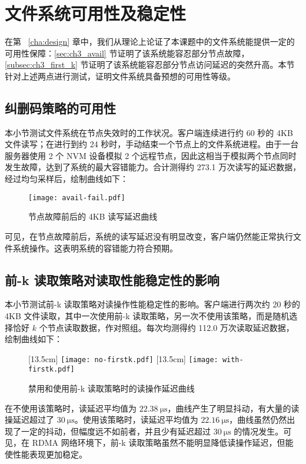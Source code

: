 \section{文件系统可用性及稳定性}
\label{sec:ch4_avail_test}

在第 ~\ref{cha:design} 章中，我们从理论上论证了本课题中的文件系统能提供一定的可用性保障：\ref{sec:ch3_avail} 节证明了该系统能容忍部分节点故障，\ref{subsec:ch3_first_k} 节证明了该系统能容忍部分节点访问延迟的突然升高。本节针对上述两点进行测试，证明文件系统具备预想的可用性等级。

\subsection{纠删码策略的可用性}
\label{subsec:ch4_fail_test}

本小节测试文件系统在节点失效时的工作状况。客户端连续进行约 60 秒的 4KB 文件读写；在进行到约 24 秒时，手动结束一个节点上的文件系统进程。由于一台服务器使用 2 个 NVM 设备模拟 2 个远程节点，因此这相当于模拟两个节点同时发生故障，达到了系统的最大容错能力。合计测得约 273.1 万次读写的延迟数据，经过均匀采样后，绘制曲线如下：

\begin{figure}[H]
    \centering
    \texttt{[image: avail-fail.pdf]}
    \caption{节点故障前后的 4KB 读写延迟曲线}
    \label{fig:avail_fail}
\end{figure}

可见，在节点故障前后，系统的读写延迟没有明显改变，客户端仍然能正常执行文件系统操作。这表明系统的容错能力符合预期。

\subsection{前-k 读取策略对读取性能稳定性的影响}
\label{subsec:ch4_first_k_test}

本小节测试前-k 读取策略对读操作性能稳定性的影响。客户端进行两次约 20 秒的 4KB 文件读取，其中一次使用前-k 读取策略，另一次不使用该策略，而是随机选择恰好 $k$ 个节点读取数据，作对照组。每次均测得约 112.0 万次读取延迟数据，绘制曲线如下：

\begin{figure}[H]
    \centering
    [13.5cm] 
        {\texttt{[image: no-firstk.pdf]}}
    [13.5cm] 
        {\texttt{[image: with-firstk.pdf]}}   
    \caption{禁用和使用前-k 读取策略时的读操作延迟曲线}
    \label{fig:first_k}
\end{figure}

在不使用该策略时，读延迟平均值为 $\SI{22.38}{\us}$，曲线产生了明显抖动，有大量的读操延迟超过了 $\SI{30}{\us}$。使用该策略时，读延迟平均值为 $\SI{22.16}{\us}$，曲线虽然仍然出现了一定的抖动，但幅度远不如前者，并且少有延迟超过 $\SI{30}{\us}$ 的情况发生。可见，在 RDMA 网络环境下，前-k 读取策略虽然不能明显降低读操作延迟，但能使性能表现更加稳定。
